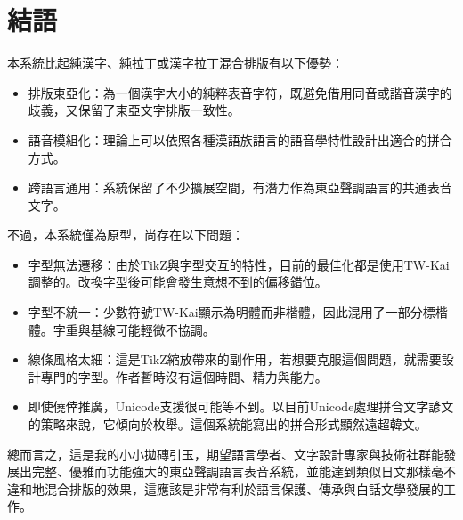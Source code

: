 \section{結語}
本系統比起純漢字、純拉丁或漢字拉丁混合排版有以下優勢：\par
\begin{itemize}
	\item 排版東亞化：為一個漢字大小的純粹表音字符，既避免借用同音或諧音漢字的歧義，又保留了東亞文字排版一致性。
	\item 語音模組化：理論上可以依照各種漢語族語言的語音學特性設計出適合的拼合方式。
	\item 跨語言通用：系統保留了不少擴展空間，有潛力作為東亞聲調語言的共通表音文字。
\end{itemize}
不過，本系統僅為原型，尚存在以下問題：
\begin{itemize}
	\item 字型無法遷移：由於TikZ與字型交互的特性，目前的最佳化都是使用TW-Kai調整的。改換字型後可能會發生意想不到的偏移錯位。
	\item 字型不統一：少數符號TW-Kai顯示為明體而非楷體，因此混用了一部分標楷體。字重與基線可能輕微不協調。
	\item 線條風格太細：這是TikZ縮放帶來的副作用，若想要克服這個問題，就需要設計專門的字型。作者暫時沒有這個時間、精力與能力。
	\item 即使僥倖推廣，Unicode支援很可能等不到。以目前Unicode處理拼合文字諺文的策略來說，它傾向於枚舉。這個系統能寫出的拼合形式顯然遠超韓文。
\end{itemize}
總而言之，這是我的小小拋磚引玉，期望語言學者、文字設計專家與技術社群能發展出完整、優雅而功能強大的東亞聲調語言表音系統，並能達到類似日文那樣毫不違和地混合排版的效果，這應該是非常有利於語言保護、傳承與白話文學發展的工作。
\clearpage